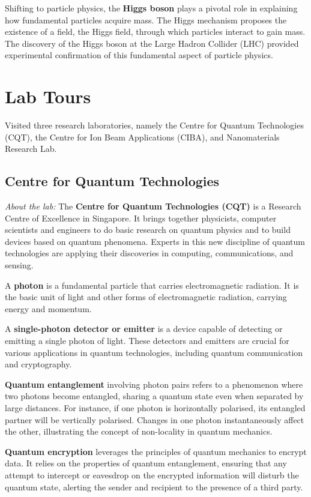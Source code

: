 \documentclass[12pt,a4paper]{article}
\begin{document}
Shifting to particle physics, the \textbf{Higgs boson} plays a pivotal role in explaining how fundamental particles acquire mass. The Higgs mechanism proposes the existence of a field, the Higgs field, through which particles interact to gain mass. The discovery of the Higgs boson at the Large Hadron Collider (LHC) provided experimental confirmation of this fundamental aspect of particle physics.
\pagebreak

\section{Lab Tours}
Visited three research laboratories, namely the Centre for Quantum Technologies (CQT), the Centre for Ion Beam Applications (CIBA), and Nanomaterials Research Lab.

\subsection{Centre for Quantum Technologies}
{\color{red}\textit{About the lab:}} The \textbf{Centre for Quantum Technologies (CQT)} is a Research Centre of Excellence in Singapore. It brings together physicists, computer scientists and engineers to do basic research on quantum physics and to build devices based on quantum phenomena. Experts in this new discipline of quantum technologies are applying their discoveries in computing, communications, and sensing.

A \textbf{photon} is a fundamental particle that carries electromagnetic radiation. It is the basic unit of light and other forms of electromagnetic radiation, carrying energy and momentum.

A \textbf{single-photon detector or emitter} is a device capable of detecting or emitting a single photon of light. These detectors and emitters are crucial for various applications in quantum technologies, including quantum communication and cryptography.

\textbf{Quantum entanglement} involving photon pairs refers to a phenomenon where two photons become entangled, sharing a quantum state even when separated by large distances. For instance, if one photon is horizontally polarised, its entangled partner will be vertically polarised. Changes in one photon instantaneously affect the other, illustrating the concept of non-locality in quantum mechanics.

\textbf{Quantum encryption} leverages the principles of quantum mechanics to encrypt data. It relies on the properties of quantum entanglement, ensuring that any attempt to intercept or eavesdrop on the encrypted information will disturb the quantum state, alerting the sender and recipient to the presence of a third party.
\end{document}
